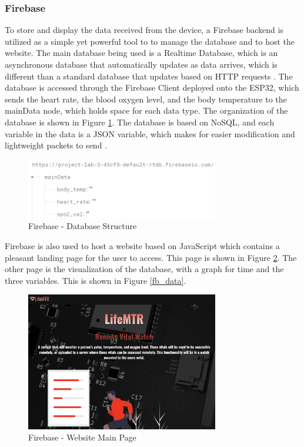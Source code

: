 \documentclass[12pt]{article}
\begin{document}
    \subsubsection{Firebase}
    To store and display the data received from the device, a Firebase backend is utilized as a simple yet powerful tool to to manage the database and to host the website. The main database being used is a Realtime Database, which is an asynchronous database that automatically updates as data arrives, which is different than a standard database that updates based on HTTP requests \cite{firebase}. The database is accessed through the Firebase Client deployed onto the ESP32, which sends the heart rate, the blood oxygen level, and the body temperature to the mainData node, which holds space for each data type. The organization of the database is shown in Figure \ref{fb_struct}. The database is based on NoSQL, and each variable in the data is a JSON variable, which makes for easier modification and lightweight packets to send \cite{firebase}. 

    \begin{figure}[ht]
        \centering
        \includegraphics[width=0.75\textwidth]{firebase_structure}
        \caption{Firebase - Database Structure}
        \label{fb_struct}
    \end{figure} 

    Firebase is also used to host a website based on JavaScript which contains a pleasant landing page for the user to access. This page is shown in Figure \ref{fb_website}. The other page is the visualization of the database, with a graph for time and the three variables.  This is shown in Figure \ref{fb_data}.

    \begin{figure}[ht]
        \centering
        \includegraphics[width=0.75\textwidth]{images/fb_website.png}
        \caption{Firebase - Website Main Page}
        \label{fb_website}
    \end{figure} 
\end{document}
